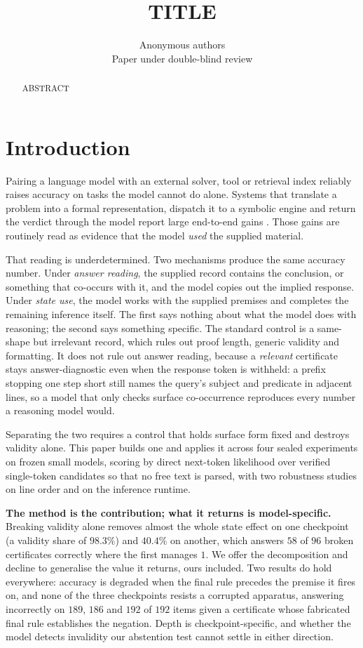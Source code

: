\documentclass[10pt]{article}
\title{TITLE}
\author{Anonymous authors\\Paper under double-blind review}
\date{}
\begin{document}
\maketitle

\begin{abstract}
ABSTRACT
\end{abstract}

\section{Introduction}

Pairing a language model with an external solver, tool or retrieval index
reliably raises accuracy on tasks the model cannot do alone. Systems that translate a problem into a formal representation, dispatch it to a
symbolic engine and return the verdict through the model report large end-to-end
gains \citep{pan2023logiclm,olausson2023linc,ye2023satlm,gao2022pal,schick2023toolformer,yang2023leandojo,lewis2020retrievalaugmented}.
Those gains are routinely read as evidence that the model \emph{used} the
supplied material.

That reading is underdetermined. Two mechanisms produce the same accuracy
number. Under \emph{answer reading}, the supplied record contains the
conclusion, or something that co-occurs with it, and the model copies out the
implied response. Under \emph{state use}, the model works with the supplied
premises and completes the remaining inference itself. The first says nothing
about what the model does with reasoning; the second says something specific.
The standard control is a same-shape but irrelevant record, which rules out
proof length, generic validity and formatting. It does not rule out answer
reading, because a \emph{relevant} certificate stays answer-diagnostic even when
the response token is withheld: a prefix stopping one step short still names the
query's subject and predicate in adjacent lines, so a model that only checks
surface co-occurrence reproduces every number a reasoning model would.

Separating the two requires a control that holds surface form fixed and destroys
validity alone. This paper builds one and applies it across four sealed experiments on frozen
small models, scoring by direct next-token likelihood over verified single-token
candidates so that no free text is parsed, with two robustness studies
on line order and on the inference runtime.

\textbf{The method is the contribution; what it returns is model-specific.}
Breaking validity alone removes almost the whole state effect on one checkpoint
(a validity share of $98.3\%$) and $40.4\%$ on another, which answers $58$ of $96$
broken certificates correctly where the first manages $1$. We offer the
decomposition and decline to generalise the value it returns, ours included.
Two results do hold everywhere: accuracy is degraded when the final rule
precedes the premise it fires on, and none of the three checkpoints resists a
corrupted apparatus, answering incorrectly on $189$, $186$ and $192$ of $192$
items given a certificate whose fabricated final rule establishes the negation.
Depth is checkpoint-specific, and whether the model detects invalidity our
abstention test cannot settle in either direction.
\end{document}
